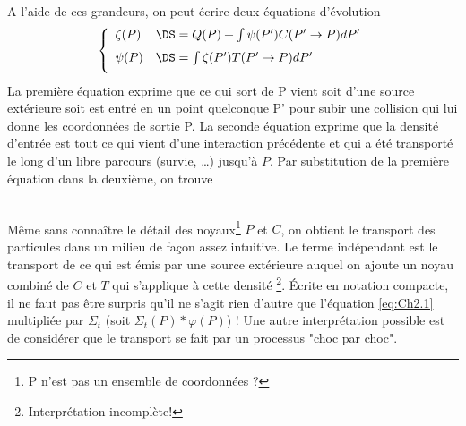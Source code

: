A l'aide de ces grandeurs, on peut écrire deux équations d'évolution
\begin{equation}
\left\{\begin{array}{ll}
\zeta (P) &\DS= Q(P) + \int\limits_{}   \psi (P')C(P' \to P)dP'\\
\psi (P) &\DS= \int\limits_{}   \zeta (P')T(P' \to P)dP'
\end{array}\right.
\end{equation}
La première équation exprime que ce qui sort de P vient soit d'une source extérieure soit
est entré en un point quelconque P' pour subir une collision qui lui donne les coordonnées
de sortie P.
La seconde équation exprime que la densité d'entrée est tout ce qui vient d'une interaction 
précédente et qui a été transporté le long d'un libre parcours (survie, \dots) jusqu'à $P$.
Par substitution de la première équation dans la deuxième, on trouve\\

\ 

Même sans connaître le détail des noyaux\footnote{P n'est pas un ensemble de coordonnées ?}
 $P$ et $C$, on obtient le transport des particules dans un 
milieu de façon assez intuitive. Le terme indépendant est le transport de ce qui est émis par une 
source extérieure auquel on ajoute un noyau combiné de $C$ et $T$ qui s'applique à cette densité
\footnote{Interprétation incomplète!}. Écrite en notation compacte, il ne faut pas être surpris 
qu'il ne s'agit rien d'autre que l'équation \eqref{eq:Ch2.1} multipliée par $\Sigma_t$ (soit 
$\Sigma_t(P)*\varphi(P)$) ! Une autre interprétation possible est de considérer que le transport 
se fait par un processus "choc par choc".


